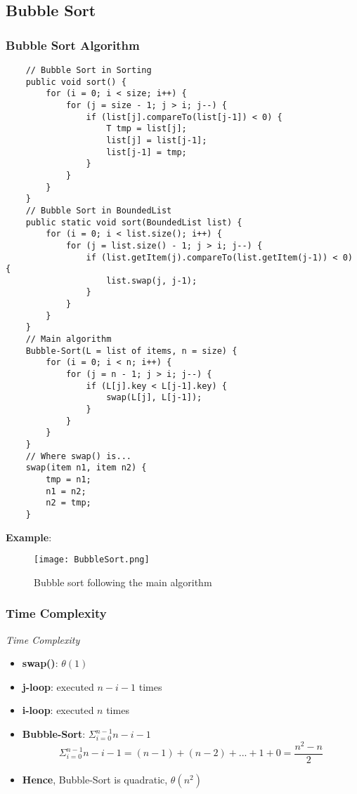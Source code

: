 \documentclass[10pt, 
a4paper, 
oneside, 
headinclude, footinclude, 
BCOR5mm]
{scrartcl}
\begin{document}
\subsection{Bubble Sort}
\subsubsection{Bubble Sort Algorithm}
\begin{lstlisting}
    // Bubble Sort in Sorting
    public void sort() {
        for (i = 0; i < size; i++) {
            for (j = size - 1; j > i; j--) {
                if (list[j].compareTo(list[j-1]) < 0) {
                    T tmp = list[j];
                    list[j] = list[j-1];
                    list[j-1] = tmp;
                }
            }
        }
    }
    // Bubble Sort in BoundedList
    public static void sort(BoundedList list) {
        for (i = 0; i < list.size(); i++) {
            for (j = list.size() - 1; j > i; j--) {
                if (list.getItem(j).compareTo(list.getItem(j-1)) < 0) {
                    list.swap(j, j-1);
                }
            }
        }
    }
    // Main algorithm
    Bubble-Sort(L = list of items, n = size) {
        for (i = 0; i < n; i++) {
            for (j = n - 1; j > i; j--) {
                if (L[j].key < L[j-1].key) {
                    swap(L[j], L[j-1]);
                }
            }
        }
    }
    // Where swap() is...
    swap(item n1, item n2) {
        tmp = n1;
        n1 = n2;
        n2 = tmp;
    }
\end{lstlisting}
\newpage
\textbf{Example}:
\begin{figure}[H]
    \begin{center}
        \texttt{[image: BubbleSort.png]}
        \caption{Bubble sort following the main algorithm}
    \end{center}
\end{figure}

\subsubsection{Time Complexity}
\begin{definition}
    \textit{Time Complexity}
    \begin{itemize}
        \item \textbf{swap()}: $\theta(1)$
        \item \textbf{j-loop}: executed $n-i-1$ times
        \item \textbf{i-loop}: executed $n$ times
        \item \textbf{Bubble-Sort}: $\Sigma^{n-1}_{i=0}n-i-1$ $$\Sigma^{n-1}_{i=0}n-i-1=(n-1)+(n-2)+...+1+0=\frac{n^2-n}{2}$$
        \item \textbf{Hence}, Bubble-Sort is quadratic, $\theta(n^2)$
    \end{itemize}
\end{definition}
\newpage
\end{document}
